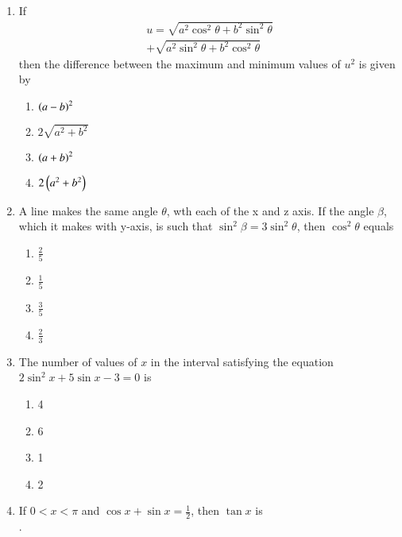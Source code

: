 \documentclass[journal,12pt,twocolumn]{IEEEtran}
\theoremstyle{remark}
\begin{document}
\begin{enumerate}
\item If
\begin{multline*}
u=\sqrt{a^2 \cos^2 \theta+b^2 \sin^2 \theta}\\
+\sqrt{a^2 \sin^2 \theta+b^2 \cos^2 \theta}
\end{multline*}
then the difference between the  maximum and minimum values of $u^2$ is given by \hfill{}
\begin{multicols}{2} 
\begin{enumerate}
\item $\left(a-b\right)^2$
\item $2\sqrt{a^2 +b^2}$
\columnbreak
\item $\left(a+b\right)^2$
\item $2\left(a^2 +b^2\right)$
\end{enumerate} 
\end{multicols}
\item A line makes the same angle $\theta$, wth each of the x and z axis. 
If the angle $\beta$, which it makes with y-axis, is such that
$\sin^2 \beta=3\sin^2 \theta$, then $\cos^2 \theta$ equals \hfill{}
\begin{multicols}{2} 
\begin{enumerate}
\item $\frac{2}{5}$
\item $\frac{1}{5}$
\columnbreak
\item $\frac{3}{5}$
\item $\frac{2}{3}$
\end{enumerate} 
\end{multicols}
\item The number of values of $x$ in the interval  satisfying the equation 
\\$2\sin^2 x+5\sin x-3=0$ is \hfill{}
\begin{multicols}{4}
\begin{enumerate}
\item 4
\columnbreak
\item 6
\columnbreak
\item 1
\columnbreak
\item 2
\end{enumerate} 
\end{multicols}
\item If $0<x<\pi$ and $\cos x+\sin x=\frac{1}{2}$, then $\tan x$ is 
\\.\hfill{}
\begin{multicols}{2} 
\begin{enumerate}

\end{enumerate}
\end{multicols}
\end{enumerate}
\end{document}
